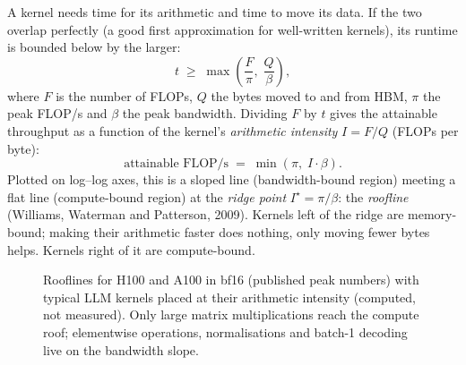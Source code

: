 A kernel needs time for its arithmetic and time to move its data. If the two overlap perfectly (a good
first approximation for well-written kernels), its runtime is bounded below by the larger:
\begin{equation}
t \;\ge\; \max\!\left(\frac{F}{\pi},\; \frac{Q}{\beta}\right),
\label{eq:pytorch:roofline}
\end{equation}
where $F$ is the number of FLOPs, $Q$ the bytes moved to and from HBM, $\pi$ the peak FLOP/s and $\beta$ the peak
bandwidth. Dividing $F$ by $t$ gives the attainable throughput as a function of the kernel's
\emph{arithmetic intensity} $I = F/Q$ (FLOPs per byte):
\begin{equation}
\text{attainable FLOP/s} \;=\; \min(\pi,\; I\cdot\beta).
\label{eq:pytorch:attain}
\end{equation}
Plotted on log--log axes, this is a sloped line (bandwidth-bound region) meeting a flat line (compute-bound
region) at the \emph{ridge point} $I^\star=\pi/\beta$: the \emph{roofline} (Williams, Waterman and Patterson,
2009). Kernels left of the ridge are memory-bound; making their arithmetic faster does nothing, only moving
fewer bytes helps. Kernels right of it are compute-bound.

\begin{figure}[t]
\centering
{}
\caption{Rooflines for H100 and A100 in bf16 (published peak numbers) with typical LLM kernels placed at
their arithmetic intensity (computed, not measured). Only large matrix multiplications reach the compute
roof; elementwise operations, normalisations and batch-1 decoding live on the bandwidth slope.}
\label{fig:pytorch:roofline}
\end{figure}

